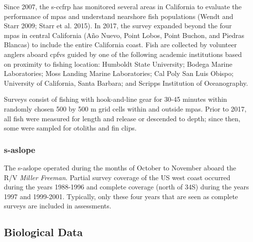 \documentclass[11pt,
  english,
  a4paper,
]{article}
\begin{document}
\leavevmode\tagmcend\tagstructend

Since 2007, the \Gls{s-ccfrp} has monitored several areas in California to evaluate the performance of \Gls{mpa}s and understand nearshore fish populations {(Wendt and Starr 2009; Starr et al. 2015)\leavevmode\tagmcend\tagstructend}. In 2017, the survey expanded beyond the four \Gls{mpa}s in central California (Año Nuevo, Point Lobos, Point Buchon, and Piedras Blancas) to include the entire California coast. Fish are collected by volunteer anglers aboard \Gls{cpfv}s guided by one of the following academic institutions based on proximity to fishing location: Humboldt State University; Bodega Marine Laboratories; Moss Landing Marine Laboratories; Cal Poly San Luis Obispo; University of California, Santa Barbara; and Scripps Institution of Oceanography.

Surveys consist of fishing with hook-and-line gear for 30-45 minutes within randomly chosen 500 by 500 m grid cells within and outside \Gls{mpa}s. Prior to 2017, all fish were measured for length and release or descended to depth; since then, some were sampled for otoliths and fin clips.


\hypertarget{section-3}{%
\subsubsection{\texorpdfstring{\acrlong{s-aslope}}{}}\label{section-3}}

\leavevmode\tagmcend\tagstructend

The \gls{s-aslope} operated during the months of October to November aboard the R/V \emph{Miller Freeman}. Partial survey coverage of the US west coast occurred during the years 1988-1996 and complete coverage (north of 34\textquotesingle S) during the years 1997 and 1999-2001. Typically, only these four years that are seen as complete surveys are included in assessments.


\hypertarget{biological-data}{%
\subsection{Biological Data}\label{biological-data}}

\leavevmode\tagmcend\tagstructend

\end{document}
